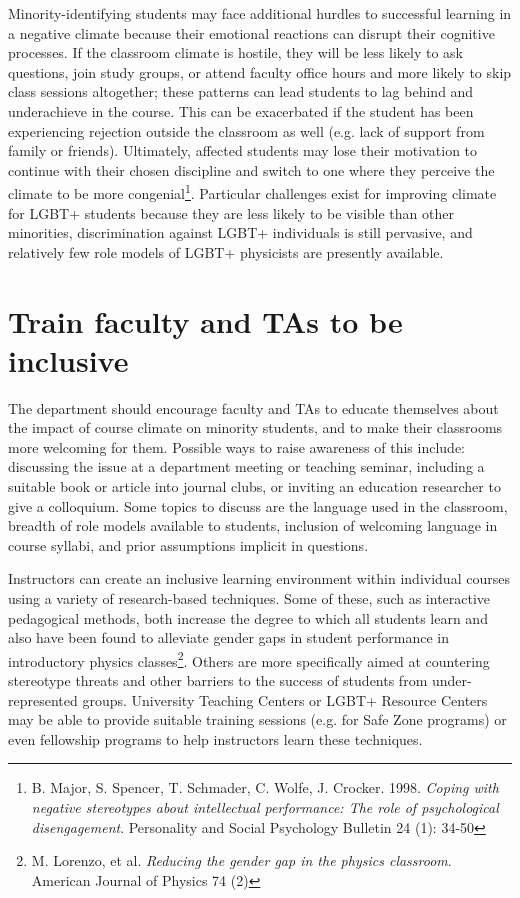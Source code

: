 Minority-identifying students may face additional hurdles to successful learning in a negative climate because their emotional reactions can disrupt their cognitive processes. If the classroom climate is hostile, they will be less likely to ask questions, join study groups, or attend faculty office hours and more likely to skip class sessions altogether; these patterns can lead students to lag behind and underachieve in the course. This can be exacerbated if the student has been experiencing rejection outside the classroom as well (e.g. lack of support from family or friends). Ultimately, affected students may lose their motivation to continue with their chosen discipline and switch to one where they perceive the climate to be more congenial\footnote{B. Major, S. Spencer, T. Schmader, C. Wolfe, J. Crocker. 1998. \emph{Coping with negative stereotypes about intellectual performance: The role of psychological disengagement}. Personality and Social Psychology Bulletin 24 (1): 34-50}. Particular challenges exist for improving climate for LGBT+ students because they are less likely to be visible than other minorities, discrimination against LGBT+ individuals is still pervasive, and relatively few role models of LGBT+ physicists are presently available.

\section {Train faculty and TAs to be inclusive}
\label{train-faculty}
The department should encourage faculty and TAs to educate themselves about the impact of course climate on minority students, and to make their classrooms more welcoming for them. Possible ways to raise awareness of this include: discussing the issue at a department meeting or teaching seminar, including a suitable book or article into journal clubs, or inviting an education researcher to give a colloquium. Some topics to discuss are the language used in the classroom, breadth of role models available to students, inclusion of welcoming language in course syllabi, and prior assumptions implicit in questions.

Instructors can create an inclusive learning environment within individual courses using a variety of research-based techniques. Some of these, such as interactive pedagogical methods, both increase the degree to which all students learn and also have been found to alleviate gender gaps in student performance in introductory physics classes\footnote{M. Lorenzo, et al. \emph{Reducing the gender gap in the physics classroom}. American Journal of Physics 74 (2)}. Others are more specifically aimed at countering stereotype threats and other barriers to the success of students from under-represented groups. University Teaching Centers or LGBT+ Resource Centers may be able to provide suitable training sessions (e.g. for Safe Zone programs) or even fellowship programs to help instructors learn these techniques. 

